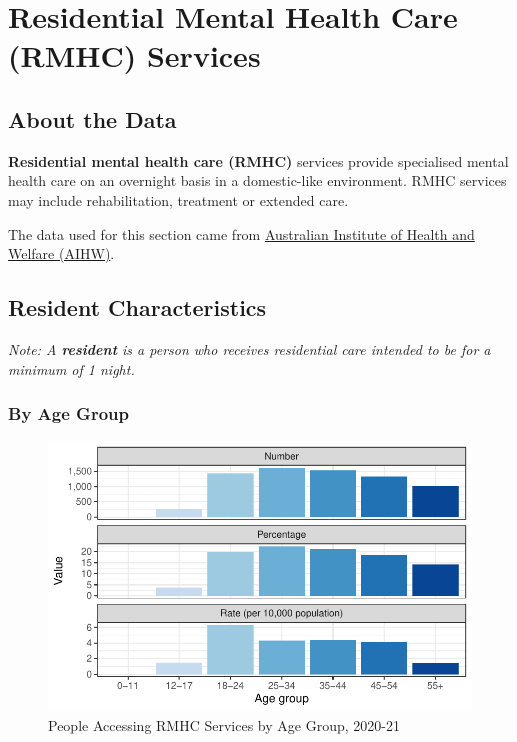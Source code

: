 \documentclass[
  a4paper,
  DIV=11,
  numbers=noendperiod]{scrreport}
\begin{document}

\hypertarget{residential-mental-health-care-rmhc-services}{%
\chapter{Residential Mental Health Care (RMHC)
Services}\label{residential-mental-health-care-rmhc-services}}

\hypertarget{about-the-data-3}{%
\section{About the Data}\label{about-the-data-3}}

\textbf{Residential mental health care (RMHC)} services provide
specialised mental health care on an overnight basis in a domestic-like
environment. RMHC services may include rehabilitation, treatment or
extended care.

The data used for this section came from
\href{https://www.aihw.gov.au/mental-health/topic-areas/residential-services}{Australian
Institute of Health and Welfare (AIHW)}.

\hypertarget{resident-characteristics}{%
\section{Resident Characteristics}\label{resident-characteristics}}

\emph{Note: A \textbf{resident} is a person who receives residential
care intended to be for a minimum of 1 night.}

\hypertarget{by-age-group-4}{%
\subsection{By Age Group}\label{by-age-group-4}}

\begin{figure}

\caption{\label{fig-rmhc-ra}People Accessing RMHC Services by Age Group,
2020-21}

{\centering \includegraphics{./chap4-rmhc_files/figure-pdf/fig-rmhc-ra-1.pdf}

}

\end{figure}
\end{document}
